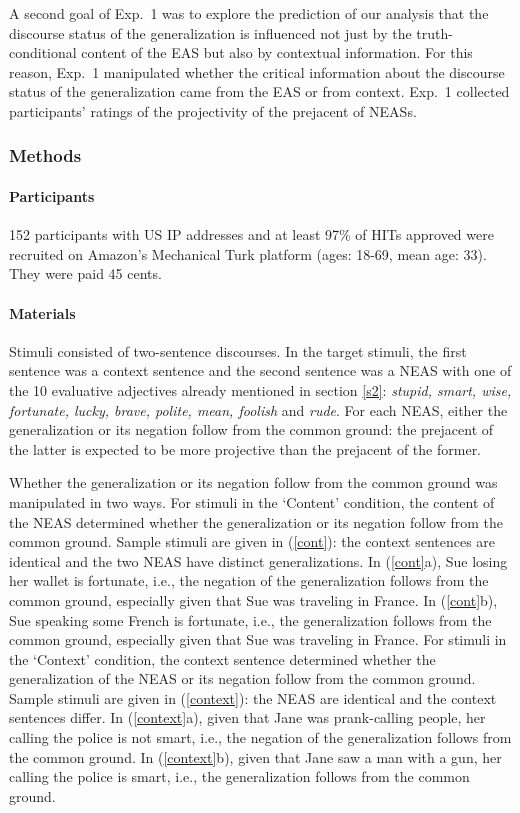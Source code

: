 \documentclass[11pt,fleqn]{article}
\newcommand{\6}{\mbox{$[\hspace*{-.6mm}[$}}
\newcommand{\9}{\mbox{$]\hspace*{-.6mm}]$}}
\begin{document}
A second goal of Exp.~1 was to explore the prediction of our analysis that the discourse status of the generalization is influenced not just by the truth-conditional content of the EAS but also by contextual information. For this reason, Exp.~1 manipulated whether the critical information about the discourse status of the generalization came from the EAS or from context. Exp.~1 collected participants' ratings of the projectivity of the prejacent of NEASs.

\subsubsection{Methods}

\paragraph{Participants} 152 participants with US IP addresses and at least 97\% of HITs approved were recruited on Amazon's Mechanical Turk platform (ages: 18-69, mean age: 33). They were paid 45 cents.

\paragraph{Materials} Stimuli consisted of two-sentence discourses. In the target stimuli, the first sentence was a context sentence and the second sentence was a NEAS with one of the 10 evaluative adjectives already mentioned in section \ref{s2}: {\em stupid, smart, wise, fortunate, lucky, brave, polite, mean, foolish} and {\em rude}. For each NEAS, either the generalization or its negation follow from the common ground: the prejacent of the latter is expected to be more projective than the prejacent of the former.

Whether the generalization or its negation follow from the common ground was manipulated in two ways. For stimuli in the `Content' condition, the content of the NEAS determined whether the generalization or its negation follow from the common ground. Sample stimuli are given in (\ref{cont}): the context sentences are identical and the two NEAS have distinct generalizations. In (\ref{cont}a), Sue losing her wallet is fortunate, i.e., the negation of the generalization follows from the common ground, especially given that Sue was traveling in France. In (\ref{cont}b), Sue speaking some French is fortunate, i.e., the generalization follows from the common ground, especially given that Sue was traveling in France. For stimuli in the `Context' condition, the context sentence determined whether the generalization of the NEAS or its negation follow from the common ground. Sample stimuli are given in (\ref{context}): the NEAS are identical and the context sentences differ. In (\ref{context}a), given that Jane was prank-calling people, her calling the police is not smart, i.e., the negation of the generalization follows from the common ground. In (\ref{context}b), given that Jane saw a man with a gun, her calling the police is smart, i.e., the generalization follows from the common ground.
\end{document}

